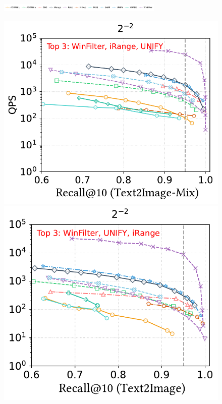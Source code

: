 \documentclass[sigconf, nonacm]{acmart}
\begin{document}
{%
	
	
\begin{figure}
	\centering
	\includegraphics[width=0.7\textwidth]{figures/exp/range_legend.pdf}
	
	\begin{minipage}[t]{0.36\textwidth}
		\centering
		\includegraphics[width=0.495\linewidth]{figures/exp/range_multimodel.pdf}
		\hfill 
		\includegraphics[width=0.47\linewidth]{figures/exp/range_multimodel_1.pdf}


\end{minipage}
\end{figure}}
\end{document}
